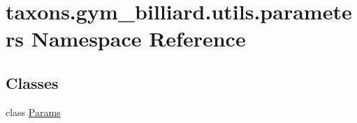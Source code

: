 \hypertarget{namespacetaxons_1_1gym__billiard_1_1utils_1_1parameters}{}\section{taxons.\+gym\+\_\+billiard.\+utils.\+parameters Namespace Reference}
\label{namespacetaxons_1_1gym__billiard_1_1utils_1_1parameters}
\subsection*{Classes}
\begin{DoxyCompactItemize}
\item 
class \hyperlink{classtaxons_1_1gym__billiard_1_1utils_1_1parameters_1_1_params}{Params}
\end{DoxyCompactItemize}
